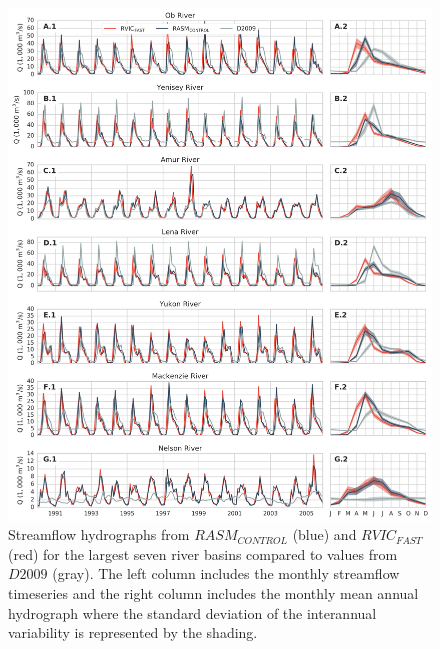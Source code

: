 \documentclass[jgrga, draft]{agutex}
\begin{document}
\clearpage
\begin{figure}
\noindent\includegraphics[width=35pc,natwidth=1]{R1010RBRbaaa01a_rvicfast_hydrographs}
\caption{Streamflow hydrographs from $RASM_{CONTROL}$ (blue) and $RVIC_{FAST}$ (red) for the largest seven river basins compared to values from $D2009$ (gray).
The left column includes the monthly streamflow timeseries and the right column includes the monthly mean annual hydrograph where the standard deviation of the interannual variability is represented by the shading.}
\label{fig:hydrographs}
\end{figure}
\end{document}
